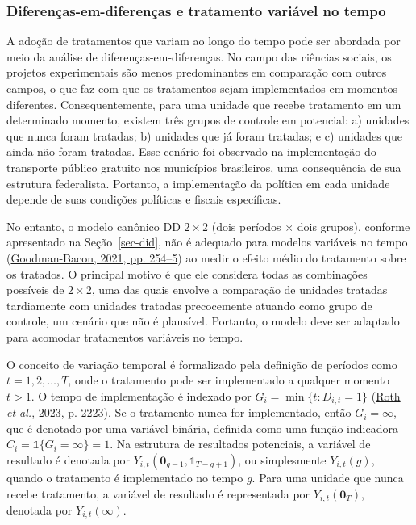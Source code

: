 \documentclass[12pt, a4paper, twoside]{article}
\numberwithin{equation}{subsection} %
\begin{document}
\hypertarget{sec-did-time-varying}{%
\subsubsection{Diferenças-em-diferenças e tratamento variável no
tempo}\label{sec-did-time-varying}}

A adoção de tratamentos que variam ao longo do tempo pode ser abordada
por meio da análise de diferenças-em-diferenças. No campo das ciências
sociais, os projetos experimentais são menos predominantes em comparação
com outros campos, o que faz com que os tratamentos sejam implementados
em momentos diferentes. Consequentemente, para uma unidade que recebe
tratamento em um determinado momento, existem três grupos de controle em
potencial: a) unidades que nunca foram tratadas; b) unidades que já
foram tratadas; e c) unidades que ainda não foram tratadas. Esse cenário
foi observado na implementação do transporte público gratuito nos
municípios brasileiros, uma consequência de sua estrutura federalista.
Portanto, a implementação da política em cada unidade depende de suas
condições políticas e fiscais específicas.

No entanto, o modelo canônico DD \(2 \times 2\) (dois períodos
\(\times\) dois grupos), conforme apresentado na Seção~\ref{sec-did},
não é adequado para modelos variáveis no tempo
(\protect\hyperlink{ref-Goodman-Bacon-2021-DiD}{Goodman-Bacon, 2021, pp.
254--5}) ao medir o efeito médio do tratamento sobre os tratados. O
principal motivo é que ele considera todas as combinações possíveis de
\(2 \times 2\), uma das quais envolve a comparação de unidades tratadas
tardiamente com unidades tratadas precocemente atuando como grupo de
controle, um cenário que não é plausível. Portanto, o modelo deve ser
adaptado para acomodar tratamentos variáveis no tempo.

O conceito de variação temporal é formalizado pela definição de períodos
como \(t = 1, 2, \dots, T\), onde o tratamento pode ser implementado a
qualquer momento \(t > 1\). O tempo de implementação é indexado por
\(G_i = \min\{t: D_{i,t} = 1\}\)
(\protect\hyperlink{ref-roth_whats_2023}{Roth \emph{et al.}, 2023, p.
2223}). Se o tratamento nunca for implementado, então \(G_i = \infty\),
que é denotado por uma variável binária, definida como uma função
indicadora \(C_i = \mathds{1}\{G_i = \infty\} = 1\). Na estrutura de
resultados potenciais, a variável de resultado é denotada por
\(Y_{i, t}(\boldsymbol{0}_{g-1}, \mathds{1}_{T-g+1})\), ou simplesmente
\(Y_{i, t}(g)\), quando o tratamento é implementado no tempo \(g\). Para
uma unidade que nunca recebe tratamento, a variável de resultado é
representada por \(Y_{i, t}(\boldsymbol{0}_{T})\), denotada por
\(Y_{i, t}(\infty)\).
\end{document}
